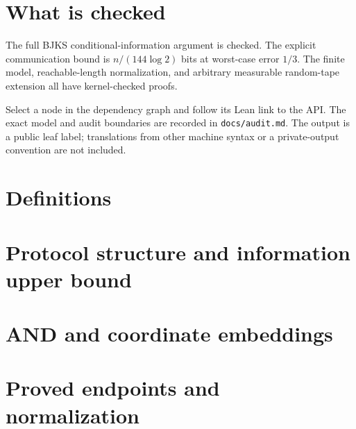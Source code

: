 

\section{What is checked}
The full BJKS conditional-information argument is checked. The explicit
communication bound is $n/(144\log 2)$ bits at worst-case error $1/3$.
The finite model, reachable-length normalization, and arbitrary measurable
random-tape extension all have kernel-checked proofs.

Select a node in the dependency graph and follow its Lean link to the API.
The exact model and audit boundaries are recorded in \texttt{docs/audit.md}.
The output is a public leaf label; translations from other machine syntax or
a private-output convention are not included.

\section{Definitions}

\section{Protocol structure and information upper bound}

\section{AND and coordinate embeddings}

\section{Proved endpoints and normalization}
